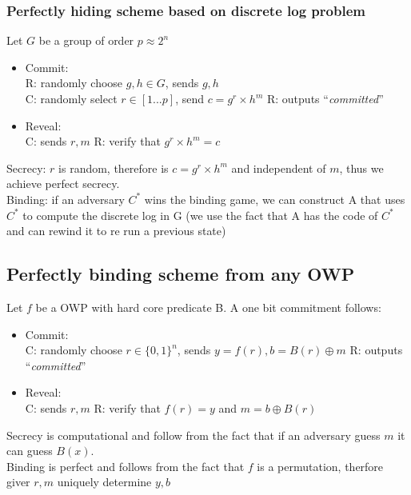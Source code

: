 \documentclass{article}
\begin{document}
\subsubsection{Perfectly hiding scheme based on discrete log problem}
Let $G$ be a group of order $p \approx 2^n$
\begin{itemize}
\item Commit: \\
R: randomly choose $g,h \in G$, sends $g,h$\\
C: randomly select $r \in [1...p]$, send $c = g^r \times h^m$
R: outputs ``\textit{committed}''
\item Reveal:\\
C: sends $r,m$
R: verify that $g^r \times h^m = c$
\end{itemize}

Secrecy: $r$ is random, therefore is $c = g^r \times h^m$ and independent of $m$, thus we achieve perfect secrecy.\\
Binding: if an adversary $C^{*}$ wins the binding game, we can construct A that uses $C^{*}$ to compute the discrete log in G (we use the fact that A has the code of $C^*$ and can rewind it to re run a previous state) 

\subsection{Perfectly binding scheme from any OWP}
Let $f$ be a OWP with hard core predicate B.
A one bit commitment follows:
\begin{itemize}
\item Commit: \\
C: randomly choose $r \in \{0,1\}^n$, sends $y = f(r),b= B(r) \oplus m$
R: outputs ``\textit{committed}''
\item Reveal:\\
C: sends $r,m$
R: verify that $f(r) = y$ and $ m = b \oplus B(r)$
\end{itemize}
Secrecy is computational and follow from the fact that if an adversary guess $m$ it can guess $B(x)$.\\
Binding is perfect and follows from the fact that $f$ is a permutation, therfore giver $r,m$ uniquely determine $y,b$
\end{document}
